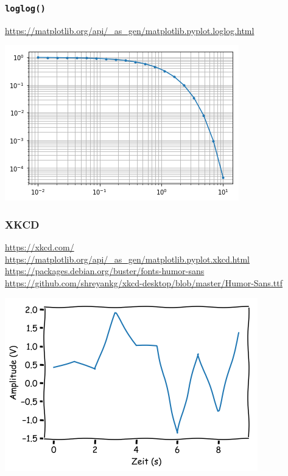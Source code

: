 \subsubsection{\texttt{loglog()}}
\url{https://matplotlib.org/api/_as_gen/matplotlib.pyplot.loglog.html}

\includegraphics[width=0.4\linewidth]{images/v9_matplotlib4}

\subsubsection{XKCD}
\url{https://xkcd.com/}\\
\url{https://matplotlib.org/api/_as_gen/matplotlib.pyplot.xkcd.html}\\
\url{https://packages.debian.org/buster/fonts-humor-sans}\\
\url{https://github.com/shreyankg/xkcd-desktop/blob/master/Humor-Sans.ttf}

\includegraphics[width=0.4\linewidth]{images/v9_matplotlib5}
